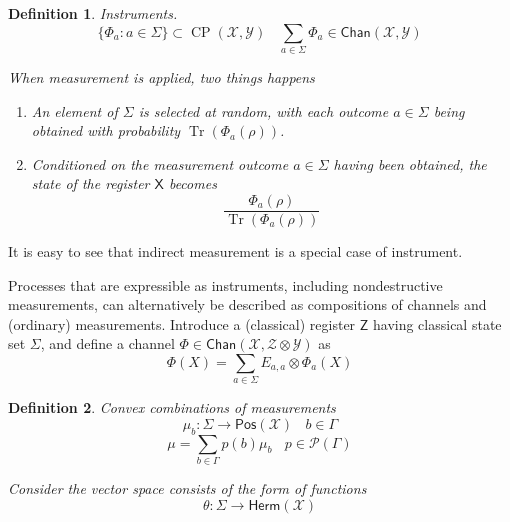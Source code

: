 \documentclass[aps,pra,onecolumn,notitlepage,superscriptaddress]{revtex4-1}
\newcommand{\reg}[1]{\mathsf{#1}}
\newcommand{\spc}[1]{\mathcal{#1}}
\newcommand{\Pos}{\mathsf{Pos}}
\newcommand{\Herm}{\mathsf{Herm}}
\newcommand{\Tr}{\operatorname{Tr}}
\newcommand{\op}[1]{\operatorname{#1}}
\newcommand{\Chan}{{\mathsf{Chan}}}
\newtheorem{defi}{Definition}
\begin{document}
    \begin{defi}
        Instruments. 
        \begin{equation}
            \{ \Phi_a : a \in \Sigma \} \subset \op{CP}(\spc X, \spc Y) \ \ \ \ \sum_{a \in \Sigma} \Phi_a \in \Chan(\spc X, \spc Y)
        \end{equation}

        When measurement is applied, two things happens
        \begin{enumerate}
            \item An element of $\Sigma$ is selected at random, with each outcome $a \in \Sigma$ being obtained with probability $\Tr(\Phi_a(\rho))$.
            \item Conditioned on the measurement outcome $a \in \Sigma$ having been obtained, the state of the register $\reg X$ becomes
            \begin{equation}
                \frac{\Phi_a(\rho)}{ \Tr(\Phi_a(\rho)) }
            \end{equation}
        \end{enumerate}
    \end{defi}
    
    It is easy to see that indirect measurement is a special case of instrument.

    Processes that are expressible as instruments, including nondestructive measurements, can alternatively be described as compositions of channels and (ordinary) measurements. Introduce a (classical) register $\reg Z$ having classical state set $\Sigma$, and define a channel $\Phi \in \Chan(\spc X, \spc Z \otimes \spc Y)$ as
    \begin{equation}
        \Phi(X) = \sum_{a \in \Sigma} E_{a,a} \otimes \Phi_a(X)
    \end{equation}

    \begin{defi}
        Convex combinations of measurements
        \begin{equation}
            \mu_b : \Sigma \to \Pos(\spc X) \ \ \ \ b \in \Gamma
        \end{equation}
        \begin{equation}
            \mu = \sum_{b \in \Gamma} p(b)\mu_b \ \ \ \ p \in \spc P(\Gamma)
        \end{equation}

        Consider the vector space consists of the form of functions
        \begin{equation}
            \theta : \Sigma \to \Herm(\spc X)
        \end{equation}
    \end{defi}
\end{document}
